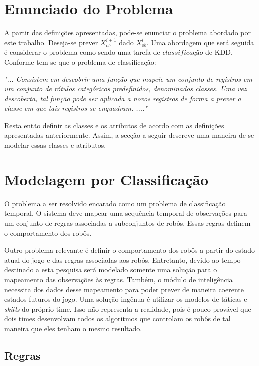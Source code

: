 \section{Enunciado do Problema}

A partir das definições apresentadas, pode-se enunciar o problema 
abordado por este trabalho. Deseja-se prever $X_{ob}^{i+1}$ dado
$X_{ob}^{i}$. Uma abordagem que será seguida é considerar
o problema como sendo uma tarefa de $classificação$ de KDD. Conforme
\cite{passos2005datamining} tem-se que o problema de classificação:

\begin{description}
  \item \textit{"... Consistem em descobrir uma função que mapeie um conjunto de
  registros em um conjunto de rótulos categóricos predefinidos, denominados
  classes. Uma vez descoberta, tal função pode ser aplicada a novos registros
  de forma a prever a classe em que tais registros se enquadram. ...."}
\end{description}

Resta então definir as classes e os atributos de acordo com as definições
apresentadas anteriormente. Assim, a secção a seguir descreve uma maneira
de se modelar essas classes e atributos.

\section{Modelagem por Classificação}

O problema a ser resolvido
encarado como um problema de classificação temporal. O sistema deve mapear uma
sequência temporal de observações para um conjunto de regras associadas a
subconjuntos de robôs. Essas regras definem o comportamento dos robôs.

Outro problema relevante é definir o comportamento dos robôs a partir do estado
atual do jogo e das regras associadas aos robôs. Entretanto, devido ao tempo
destinado a esta pesquisa será modelado somente uma solução para o mapeamento das
observações às regras. Também, o módulo de inteligência necessita dos dados
desse mapeamento para poder prever de maneira coerente estados futuros do jogo. Uma
solução ingênua é utilizar os modelos de táticas e \textit{skills} do próprio time.
Isso não representa a realidade, pois é pouco provável que dois times desenvolvam
todos os algoritmos que controlam os robôs de tal maneira que eles tenham o mesmo
resultado.

\subsection{Regras}

